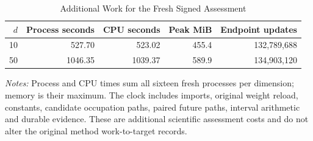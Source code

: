 \begin{table}[!htbp]
\centering
\footnotesize
\caption{Additional Work for the Fresh Signed Assessment}\label{tab:r16signedwork}
\begin{tabular}{rrrrr}
\toprule
$d$ & Process seconds & CPU seconds & Peak MiB & Endpoint updates \\
\midrule
10 & 527.70 & 523.02 & 455.4 & 132,789,688 \\
50 & 1046.35 & 1039.37 & 589.9 & 134,903,120 \\
\bottomrule
\end{tabular}
\begin{minipage}{0.97\linewidth}\footnotesize
\emph{Notes:} Process and CPU times sum all sixteen fresh processes per dimension; memory is their maximum. The clock includes imports, original weight reload, constants, candidate occupation paths, paired future paths, interval arithmetic and durable evidence. These are additional scientific assessment costs and do not alter the original method work-to-target records.
\end{minipage}
\end{table}
